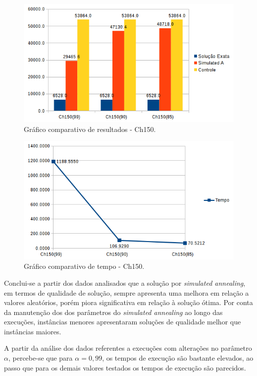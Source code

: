 \documentclass[a4paper, 12pt]{article}
\begin{document}
\begin{figure}[H]
	\centering
	\includegraphics[scale=0.8]{figures/graph5.png}
	\caption{Gráfico comparativo de resultados - Ch150.}
	\label{fig:graph5}
\end{figure}

\begin{figure}[H]
	\centering
	\includegraphics[scale=0.8]{figures/graph6.png}
	\caption{Gráfico comparativo de tempo - Ch150.}
	\label{fig:graph6}
\end{figure}

Conclui-se a partir dos dados analisados que a solução por \textit{simulated annealing}, em termos de qualidade de solução, sempre apresenta uma melhora em relação a valores aleatórios, porém piora significativa em relação à solução ótima. Por conta da manutenção dos dos parâmetros do \textit{simulated annealing} ao longo das execuções, instâncias menores apresentaram soluções de qualidade melhor que instâncias maiores.

A partir da análise dos dados referentes a execuções com alterações no parâmetro $\alpha$, percebe-se que para $\alpha = 0,99$, os tempos de execução são bastante elevados, ao passo que para os demais valores testados os tempos de execução são parecidos.
\end{document}
